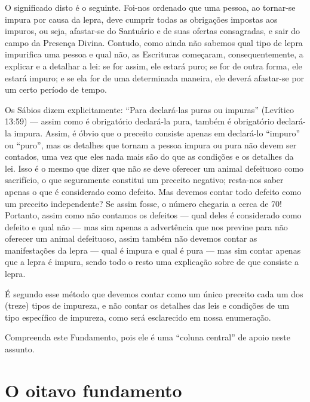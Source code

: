 O significado disto é o seguinte. Foi-nos ordenado que uma pessoa, ao
tornar-se impura por causa da lepra, deve cumprir todas as obrigações
impostas aos impuros, ou seja, afastar-se do Santuário e de suas
ofertas consagradas, e sair do campo da Presença Divina. Contudo, como
ainda não sabemos qual tipo de lepra impurifica uma pessoa e qual não,
as Escrituras começaram, consequentemente, a explicar e a detalhar a
lei: se for assim, ele estará puro; se for de outra forma, ele estará
impuro; e se ela for de uma determinada maneira, ele deverá afastar-se
por um certo período de tempo.

Os Sábios dizem explicitamente: ``Para declará-las puras ou impuras''
(Levítico 13:59) --- assim como é obrigatório declará-la pura, também é
obrigatório declará-la impura. Assim, é óbvio que o preceito consiste
apenas em declará-lo ``impuro'' ou ``puro'', mas os detalhes que tornam
a pessoa impura ou pura não devem ser contados, uma vez que eles nada
mais são do que as condições e os detalhes da lei. Isso é o mesmo que
dizer que não se deve oferecer um animal defeituoso como sacrifício, o
que seguramente constitui um preceito negativo; resta-nos saber apenas
o que é considerado como defeito. Mas devemos contar todo defeito como
um preceito independente? Se assim fosse, o número chegaria a cerca de
70! Portanto, assim como não contamos os defeitos --- qual deles é
considerado como defeito e qual não --- mas sim apenas a advertência que
nos previne para não oferecer um animal defeituoso, assim também não
devemos contar as manifestações da lepra --- qual é impura e qual é pura
--- mas sim contar apenas que a lepra é impura, sendo todo o resto uma
explicação sobre de que consiste a lepra.

É segundo esse método que devemos contar como um único preceito cada um
dos (treze) tipos de impureza, e não contar os detalhes das leis e
condições de um tipo específico de impureza, como será esclarecido em
nossa enumeração.

Compreenda este Fundamento, pois ele é uma ``coluna central'' de apoio
neste assunto.


\chapter*{O oitavo fundamento}

